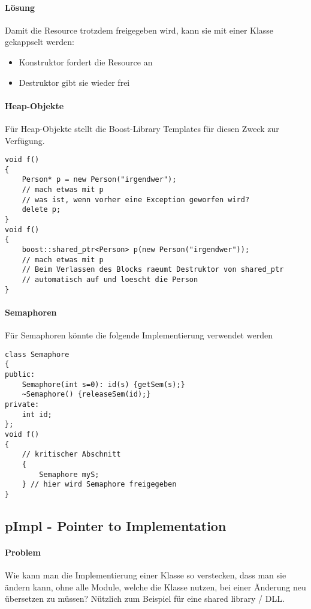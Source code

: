 \paragraph{Lösung}
Damit die Resource trotzdem freigegeben wird, kann sie mit einer Klasse gekappselt werden:
\begin{itemize}
	\item Konstruktor fordert die Resource an
	\item Destruktor gibt sie wieder frei
\end{itemize}


\paragraph{Heap-Objekte}
Für Heap-Objekte stellt die Boost-Library Templates für diesen Zweck zur Verfügung.

\begin{lstlisting}
void f()
{
	Person* p = new Person("irgendwer");
	// mach etwas mit p
	// was ist, wenn vorher eine Exception geworfen wird?
	delete p;
}
void f()
{
	boost::shared_ptr<Person> p(new Person("irgendwer"));
	// mach etwas mit p
	// Beim Verlassen des Blocks raeumt Destruktor von shared_ptr
	// automatisch auf und loescht die Person
}
\end{lstlisting}


\paragraph{Semaphoren} Für Semaphoren könnte die folgende Implementierung verwendet werden


\begin{lstlisting}
class Semaphore
{
public:
	Semaphore(int s=0): id(s) {getSem(s);}
	~Semaphore() {releaseSem(id);}
private:
	int id;
};
void f()
{
	// kritischer Abschnitt
	{
		Semaphore myS;
	} // hier wird Semaphore freigegeben
}
\end{lstlisting}


\subsection[pImpl]{pImpl - Pointer to Implementation}
\label{sec:pimpl}

\paragraph{Problem} Wie kann man die Implementierung einer Klasse so verstecken, dass man sie
ändern kann, ohne alle Module, welche die Klasse nutzen, bei einer Änderung
neu übersetzen zu müssen?
Nützlich zum Beispiel für eine shared library / DLL.

